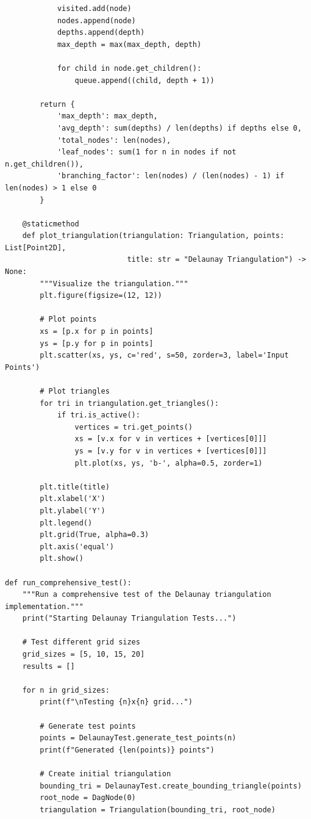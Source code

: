 \documentclass{article}
\begin{document}
\begin{lstlisting}
            visited.add(node)
            nodes.append(node)
            depths.append(depth)
            max_depth = max(max_depth, depth)
            
            for child in node.get_children():
                queue.append((child, depth + 1))
        
        return {
            'max_depth': max_depth,
            'avg_depth': sum(depths) / len(depths) if depths else 0,
            'total_nodes': len(nodes),
            'leaf_nodes': sum(1 for n in nodes if not n.get_children()),
            'branching_factor': len(nodes) / (len(nodes) - 1) if len(nodes) > 1 else 0
        }

    @staticmethod
    def plot_triangulation(triangulation: Triangulation, points: List[Point2D], 
                            title: str = "Delaunay Triangulation") -> None:
        """Visualize the triangulation."""
        plt.figure(figsize=(12, 12))
        
        # Plot points
        xs = [p.x for p in points]
        ys = [p.y for p in points]
        plt.scatter(xs, ys, c='red', s=50, zorder=3, label='Input Points')
        
        # Plot triangles
        for tri in triangulation.get_triangles():
            if tri.is_active():
                vertices = tri.get_points()
                xs = [v.x for v in vertices + [vertices[0]]]
                ys = [v.y for v in vertices + [vertices[0]]]
                plt.plot(xs, ys, 'b-', alpha=0.5, zorder=1)
        
        plt.title(title)
        plt.xlabel('X')
        plt.ylabel('Y')
        plt.legend()
        plt.grid(True, alpha=0.3)
        plt.axis('equal')
        plt.show()

def run_comprehensive_test():
    """Run a comprehensive test of the Delaunay triangulation implementation."""
    print("Starting Delaunay Triangulation Tests...")
    
    # Test different grid sizes
    grid_sizes = [5, 10, 15, 20]
    results = []
    
    for n in grid_sizes:
        print(f"\nTesting {n}x{n} grid...")
        
        # Generate test points
        points = DelaunayTest.generate_test_points(n)
        print(f"Generated {len(points)} points")
        
        # Create initial triangulation
        bounding_tri = DelaunayTest.create_bounding_triangle(points)
        root_node = DagNode(0)
        triangulation = Triangulation(bounding_tri, root_node)
        

\end{lstlisting}
\end{document}
